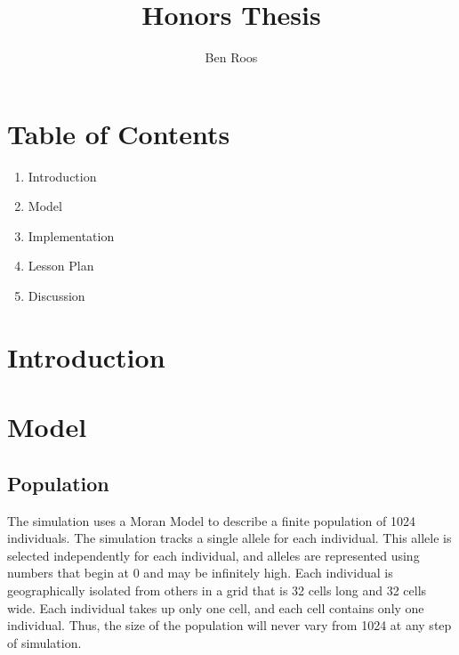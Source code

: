 \documentclass[12pt]{article}
\begin{document}
\begin{spacing}{.4}
\setlength{\droptitle}{-7em}
\title{Honors Thesis}
\author{Ben Roos}
\maketitle
\newpage
\end{spacing}

\begin{spacing}{1.5}

\section*{Table of Contents}
\begin{enumerate}
\item Introduction
\item Model
\item Implementation
\item Lesson Plan
\item Discussion

\end{enumerate}
\newpage

\section{Introduction}
\section{Model}
\subsection{Population}
The simulation uses a Moran Model to describe a finite population of 1024 individuals. The simulation tracks a single allele for each individual. This allele is selected independently for each individual, and alleles are represented using numbers that begin at 0 and may be infinitely high. Each individual is geographically isolated from others in a grid that is 32 cells long and 32 cells wide. Each individual takes up only one cell, and each cell contains only one individual. Thus, the size of the population will never vary from 1024 at any step of simulation.

\end{spacing}
\end{document}
